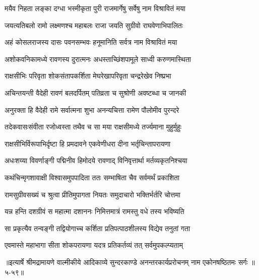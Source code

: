 \twolineshloka
{मयैव निहता लङ्का दग्धा भस्मीकृता पुरी}
{राजमार्गेषु सर्वेषु नाम विश्रावितं मया} %

\twolineshloka
{जयत्यतिबलो रामो लक्ष्मणश्च महाबलः}
{राजा जयति सुग्रीवो राघवेणाभिपालितः} %

\twolineshloka
{अहं कोसलराजस्य दासः पवनसम्भवः}
{हनूमानिति सर्वत्र नाम विश्रावितं मया} %

\twolineshloka
{अशोकवनिकामध्ये रावणस्य दुरात्मनः}
{अधस्ताच्छिंशपामूले साध्वी करुणमास्थिता} %

\twolineshloka
{राक्षसीभिः परिवृता शोकसंतापकर्शिता}
{मेघरेखापरिवृता चन्द्ररेखेव निष्प्रभा} %

\twolineshloka
{अचिन्तयन्ती वैदेही रावणं बलदर्पितम्}
{पतिव्रता च सुश्रोणी अवष्टब्धा च जानकी} %

\twolineshloka
{अनुरक्ता हि वैदेही रामे सर्वात्मना शुभा}
{अनन्यचित्ता रामेण पौलोमीव पुरन्दरे} %

\twolineshloka
{तदेकवासःसंवीता रजोध्वस्ता तथैव च}
{सा मया राक्षसीमध्ये तर्ज्यमाना मुहुर्मुहुः} %

\twolineshloka
{राक्षसीभिर्विरूपाभिर्दृष्टा हि प्रमदावने}
{एकवेणीधरा दीना भर्तृचिन्तापरायणा} %

\twolineshloka
{अधःशय्या विवर्णाङ्गी पद्मिनीव हिमोदये}
{रावणाद् विनिवृत्तार्था मर्तव्यकृतनिश्चया} %

\twolineshloka
{कथंचिन्मृगशावाक्षी विश्वासमुपपादिता}
{ततः सम्भाषिता चैव सर्वमर्थं प्रकाशिता} %

\twolineshloka
{रामसुग्रीवसख्यं च श्रुत्वा प्रीतिमुपागता}
{नियतः समुदाचारो भक्तिर्भर्तरि चोत्तमा} %

\twolineshloka
{यन्न हन्ति दशग्रीवं स महात्मा दशाननः}
{निमित्तमात्रं रामस्तु वधे तस्य भविष्यति} %

\twolineshloka
{सा प्रकृत्यैव तन्वङ्गी तद्वियोगाच्च कर्शिता}
{प्रतिपत्पाठशीलस्य विद्येव तनुतां गता} %

\twolineshloka
{एवमास्ते महाभागा सीता शोकपरायणा}
{यदत्र प्रतिकर्तव्यं तत् सर्वमुपकल्प्यताम्} %


॥इत्यार्षे श्रीमद्रामायणे वाल्मीकीये आदिकाव्ये सुन्दरकाण्डे अनन्तरकार्यप्ररोचनम् नाम एकोनषष्ठितमः सर्गः ॥५-५९॥
